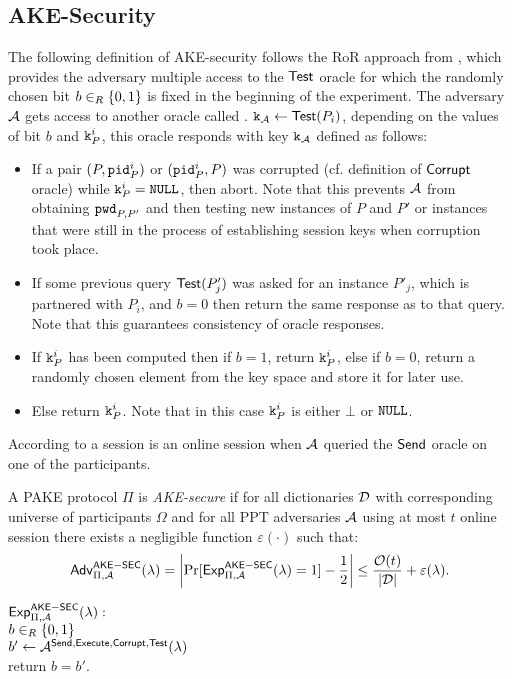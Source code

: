 \subsection{AKE-Security}\label{ssec:pake}
The following definition of \ac{AKE}-security follows the \ac{RoR} approach from \cite{Abdalla2005}, which provides the adversary multiple access to the $\mathsf{Test}$ oracle for which the randomly chosen bit $b\in_R\{0,1\}$ is fixed in the beginning of the experiment.
The adversary $\mathcal{A}$ gets access to another oracle called \Test.
$\mathtt{k}_\mathcal{A}\gets\mathsf{Test}(P_i)$, depending on the values of bit $b$ and $\mathtt{k}^i_P$, this oracle responds with key $\mathtt{k}_\mathcal{A}$ defined as follows:
\begin{itemize}
	\item If a pair $(P,\mathtt{pid}^i_P)$ or $(\mathtt{pid}^i_P, P)$ was corrupted (cf. definition of $\mathsf{Corrupt}$ oracle) while $\mathtt{k}^i_P=\mathtt{NULL}$, then abort. Note that this prevents $\mathcal{A}$ from obtaining $\mathtt{pwd}_{P,P'}$ and then testing new instances of $P$ and $P'$ or instances that were still in the process of establishing session keys when corruption took place.
	\item If some previous query $\mathsf{Test}(P'_j)$ was asked for an instance $P'_j$, which is partnered with $P_i$, and $b=0$ then return the same response as to that query. Note that this guarantees consistency of oracle responses.
	\item If $\mathtt{k}^i_P$ has been computed then if $b=1$, return $\mathtt{k}^i_P$, else if $b=0$, return a randomly chosen element from the key space and store it for later use.
	\item Else return $\mathtt{k}^i_P$. Note that in this case $\mathtt{k}^i_P$ is either $\bot$ or $\mathtt{NULL}$.
\end{itemize}
According to \cite{Abdalla2005} a session is an online session when $\mathcal{A}$ queried the $\mathsf{Send}$ oracle on one of the participants.

\begin{definition}\label{def:ake}
A \ac{PAKE} protocol $\Pi$ is \emph{\ac{AKE}-secure} if for all dictionaries $\mathcal{D}$ with corresponding universe of participants $\Omega$ and for all \ac{PPT} adversaries $\mathcal{A}$ using at most $t$ online session there exists a negligible function $\varepsilon(\cdot)$ such that:
\[\mathsf{Adv}^{\mathsf{AKE-SEC}}_{\Pi,\mathcal{A}}(\lambda)=\left|\Pr[\mathsf{Exp}_{\Pi,\mathcal{A}}^{\mathsf{AKE-SEC}}(\lambda)=1]-\frac12\right|\leq \frac{\mathcal{O}(t)}{|\mathcal{D}|}+\varepsilon(\lambda).\]

\noindent$\mathsf{Exp}_{\Pi,\mathcal{A}}^{\mathsf{AKE-SEC}}(\lambda):$ \\
\hspace*{2em} $b\in_R\{0,1\}$\\
\hspace*{2em} $b'\gets\mathcal{A}^{\mathsf{Send},\mathsf{Execute},\mathsf{Corrupt},\mathsf{Test}}(\lambda)$\\
\hspace*{2em} return $b=b'$.
\eod
\end{definition}

